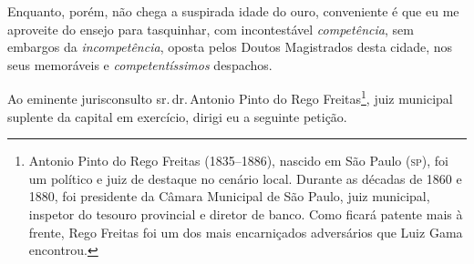 Enquanto, porém, não chega a suspirada idade do ouro, conveniente é que
eu me aproveite do ensejo para tasquinhar, com incontestável
\emph{competência}, sem embargos da \emph{incompetência}, oposta pelos
Doutos Magistrados desta cidade, nos seus memoráveis e
\emph{competentíssimos} despachos.

Ao eminente jurisconsulto sr.\,dr.\,Antonio Pinto do Rego
Freitas\footnote{Antonio Pinto do Rego Freitas (1835--1886), nascido em
  São Paulo (\textsc{sp}), foi um político e juiz de destaque no cenário local.
  Durante as décadas de 1860 e 1880, foi presidente da Câmara Municipal
  de São Paulo, juiz municipal, inspetor do tesouro provincial e diretor
  de banco. Como ficará patente mais à frente, Rego Freitas foi um dos
  mais encarniçados adversários que Luiz Gama encontrou.}, juiz
municipal suplente da capital em exercício, dirigi eu a seguinte
petição.

